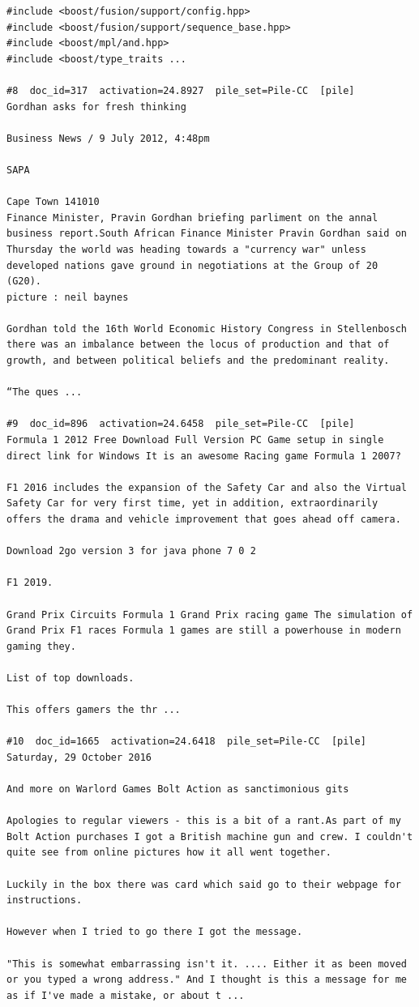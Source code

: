 \begin{verbatim}
#include <boost/fusion/support/config.hpp>
#include <boost/fusion/support/sequence_base.hpp>
#include <boost/mpl/and.hpp>
#include <boost/type_traits ...

#8  doc_id=317  activation=24.8927  pile_set=Pile-CC  [pile]
Gordhan asks for fresh thinking

Business News / 9 July 2012, 4:48pm

SAPA

Cape Town 141010
Finance Minister, Pravin Gordhan briefing parliment on the annal business report.South African Finance Minister Pravin Gordhan said on Thursday the world was heading towards a "currency war" unless developed nations gave ground in negotiations at the Group of 20 (G20).
picture : neil baynes

Gordhan told the 16th World Economic History Congress in Stellenbosch there was an imbalance between the locus of production and that of growth, and between political beliefs and the predominant reality.

“The ques ...

#9  doc_id=896  activation=24.6458  pile_set=Pile-CC  [pile]
Formula 1 2012 Free Download Full Version PC Game setup in single direct link for Windows It is an awesome Racing game Formula 1 2007?

F1 2016 includes the expansion of the Safety Car and also the Virtual Safety Car for very first time, yet in addition, extraordinarily offers the drama and vehicle improvement that goes ahead off camera.

Download 2go version 3 for java phone 7 0 2

F1 2019.

Grand Prix Circuits Formula 1 Grand Prix racing game The simulation of Grand Prix F1 races Formula 1 games are still a powerhouse in modern gaming they.

List of top downloads.

This offers gamers the thr ...

#10  doc_id=1665  activation=24.6418  pile_set=Pile-CC  [pile]
Saturday, 29 October 2016

And more on Warlord Games Bolt Action as sanctimonious gits

Apologies to regular viewers - this is a bit of a rant.As part of my Bolt Action purchases I got a British machine gun and crew. I couldn't quite see from online pictures how it all went together.

Luckily in the box there was card which said go to their webpage for instructions.

However when I tried to go there I got the message.

"This is somewhat embarrassing isn't it. .... Either it as been moved or you typed a wrong address." And I thought is this a message for me as if I've made a mistake, or about t ...

\end{verbatim}

